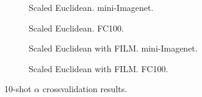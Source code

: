 \documentclass{article}
\begin{document}
\begin{figure}[t]
%
    \centering
    \begin{subfigure}[t]{0.49\textwidth}
        \caption{Scaled Euclidean. mini-Imagenet.}
        \label{fig:scaled_euclidean_miniimagenet_10shot}
    \end{subfigure}
    \begin{subfigure}[t]{0.49\textwidth}
        \caption{Scaled Euclidean. FC100.}
        \label{fig:scaled_euclidean_cifar100_10shot}
    \end{subfigure}
    \begin{subfigure}[t]{0.49\textwidth}
        \caption{Scaled Euclidean with FILM. mini-Imagenet.}
        \label{fig:scaled_euclidean_with_tbn_miniimagenet_10shot}
    \end{subfigure}
    \begin{subfigure}[t]{0.49\textwidth}
        \caption{Scaled Euclidean with FILM. FC100.}
        \label{fig:scaled_euclidean_with_tbn_cifar100_10shot}
    \end{subfigure}
    \caption{10-shot $\alpha$ crossvalidation results.}
    \label{fig:metric_scaling_10shot}
\end{figure}
\fi

\end{document}
